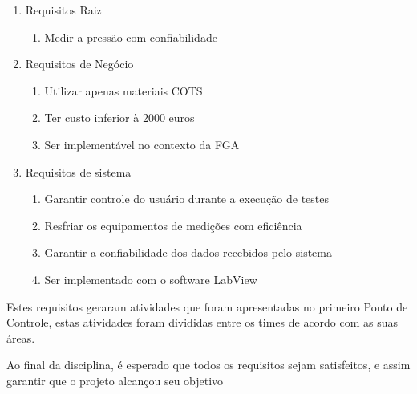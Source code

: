 \begin{enumerate}
	\item Requisitos Raiz
		\begin{enumerate}[start=1,label*={\arabic*}]
			\item Medir a pressão com confiabilidade
		\end{enumerate}
	
	\item Requisitos de Negócio
		\begin{enumerate}[start=2,label*={\arabic*}]
			\item Utilizar apenas materiais COTS
			\item Ter custo inferior à 2000 euros
			\item Ser implementável no contexto da FGA
		\end{enumerate}

	\item Requisitos de sistema
		\begin{enumerate}[start=3,label*={\arabic*}]
			\item Garantir controle do usuário durante a execução de testes
			\item Resfriar os equipamentos de medições com eficiência
			\item Garantir a confiabilidade dos dados recebidos pelo sistema
			\item Ser implementado com o software LabView
		\end{enumerate}
\end{enumerate}

Estes requisitos geraram atividades que foram apresentadas no primeiro Ponto de Controle, estas atividades foram divididas entre os times de acordo com as suas áreas.

Ao final da disciplina, é esperado que todos os requisitos sejam satisfeitos, e assim garantir que o projeto alcançou seu objetivo
